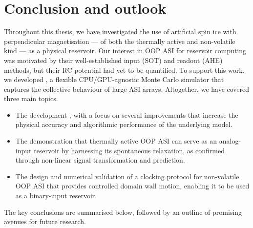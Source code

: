 \chapter{Conclusion and outlook}\label{ch:Conclusion}

Throughout this thesis, we have investigated the use of artificial spin ice with perpendicular magnetisation --- of both the thermally active and non-volatile kind --- as a physical reservoir.
Our interest in OOP ASI for reservoir computing was motivated by their well-established input (SOT) and readout (AHE) methods, but their RC potential had yet to be quantified.
To support this work, we developed \hotspice, a flexible CPU/GPU-agnostic Monte Carlo simulator that captures the collective behaviour of large ASI arrays.
Altogether, we have covered three main topics.
\begin{itemize}
	\item The development \hotspice, with a focus on several improvements that increase the physical accuracy and algorithmic performance of the underlying model.
	\item The demonstration that thermally active OOP ASI can serve as an analog-input reservoir by harnessing its spontaneous relaxation, as confirmed through non-linear signal transformation and prediction.
	\item The design and numerical validation of a clocking protocol for non-volatile OOP ASI that provides controlled domain wall motion, enabling it to be used as a binary-input reservoir.
\end{itemize}
The key conclusions are summarised below, followed by an outline of promising avenues for future research.

\newpage
